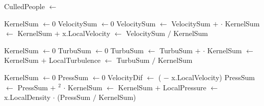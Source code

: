 
\begin{algorithmic}[1]

    \State CulledPeople $\gets$ 
\EndFor

\ForAll{}

    \State KernelSum $\gets 0$
    \State VelocitySum $\gets 0$
        \State VelocitySum $\gets$ VelocitySum $+$  $\cdot$ 
        \State KernelSum $\gets$ KernelSum $+$ 
    \EndFor
    \State x.LocalVelocity $\gets$ VelocitySum $/$ KernelSum
\EndFor

    \State KernelSum $\gets 0$
    \State TurbuSum $\gets 0$
        \State TurbuSum $\gets$ TurbuSum $+$  $\cdot$ 
        \State KernelSum $\gets$ KernelSum $+$ 
    \EndFor
    \State LocalTurbulence $\gets$ TurbuSum $/$ KernelSum
\EndFor

    \State KernelSum $\gets 0$
    \State PressSum $\gets 0$
        \State VelocityDif $\gets$ ( $-$ x.LocalVelocity)
        \State PressSum $\gets$ PressSum $+$ $^2$ $\cdot$ 
        \State KernelSum $\gets$ KernelSum $+$ 
    \EndFor
    \State LocalPressure $\gets$ x.LocalDensity $\cdot$ (PressSum $/$ KernelSum)
\EndFor
\EndFunction
\end{algorithmic}